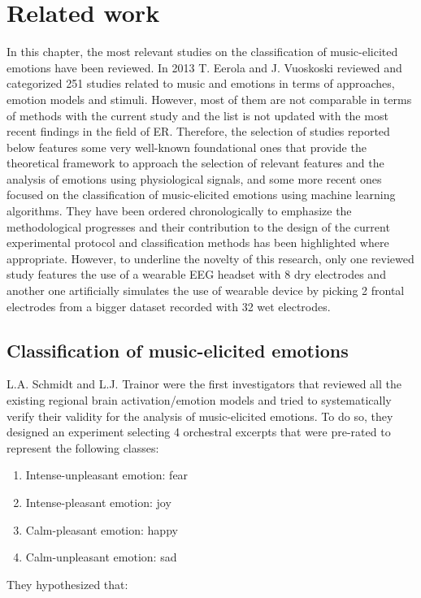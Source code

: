 \chapter{Related work}
\label{chap:related_work}
In this chapter, the most relevant studies on the classification of music-elicited emotions have been reviewed. In 2013 T. Eerola and J. Vuoskoski \cite{eerola_review_2013} reviewed and categorized 251 studies related to music and emotions in terms of approaches, emotion models and stimuli. However, most of them are not comparable in terms of methods with the current study and the list is not updated with the most recent findings in the field of \ac{ER}. Therefore, the selection of studies reported below features some very well-known foundational ones that provide the theoretical framework to approach the selection of relevant features and the analysis of emotions using physiological signals, and some more recent ones focused on the classification of music-elicited emotions using machine learning algorithms. They have been ordered chronologically to emphasize the methodological progresses and their contribution to the design of the current experimental protocol and classification methods has been highlighted where appropriate. However, to underline the novelty of this research, only one reviewed study features the use of a wearable \ac{EEG} headset with 8 dry electrodes and another one artificially simulates the use of wearable device by picking 2 frontal electrodes from a bigger dataset recorded with 32 wet electrodes.

\section{Classification of music-elicited emotions}
\label{sec:classification_emotions}
L.A. Schmidt and L.J. Trainor \cite{schmidt_frontal_2001} were the first investigators that reviewed all the existing regional brain activation/emotion models and tried to systematically verify their validity for the analysis of music-elicited emotions. To do so, they designed an experiment selecting 4 orchestral excerpts that were pre-rated to represent the following classes:
\begin{enumerate}
\item Intense-unpleasant emotion: fear
\item Intense-pleasant emotion: joy
\item Calm-pleasant emotion: happy
\item Calm-unpleasant emotion: sad
\end{enumerate}
They hypothesized that:

